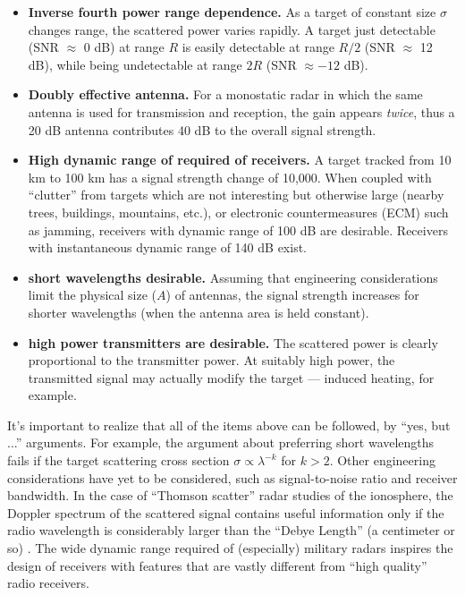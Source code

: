 \begin{itemize}
\item \textbf{Inverse fourth power range dependence.}  As a target of
constant size $\sigma$ changes range, the scattered power varies
rapidly.  A target just detectable (SNR $\approx$ 0 dB) at range $R$ is
easily detectable at range $R/2$ (SNR $\approx$ 12 dB), while being
undetectable at range $2R$ (SNR $\approx -12$ dB).
\item \textbf{Doubly effective antenna.}  For a monostatic radar in
which the same antenna is used for transmission and reception, the
gain appears \textit{twice}, thus a 20 dB antenna contributes 40 dB to
the overall signal strength.
\item \textbf{High dynamic range of required of receivers.}  A target
tracked from 10 km to 100 km has a signal strength change of 10,000.
When coupled with ``clutter'' from targets which are not interesting
but otherwise large (nearby trees, buildings, mountains, etc.), or
electronic countermeasures (ECM) such as jamming, receivers with
dynamic range of 100 dB are desirable.  Receivers with instantaneous
dynamic range of 140 dB exist.
\item \textbf{short wavelengths desirable.}  Assuming that engineering
considerations limit the physical size ($A$) of antennas, the signal
strength increases for shorter wavelengths (when the antenna area is
held constant).
\item \textbf{high power transmitters are desirable.}  The scattered
power is clearly proportional to the transmitter power.  At suitably
high power, the transmitted signal may actually modify the target ---
induced heating, for example.
\end{itemize}

It's important to realize that all of the items above can be followed,
by ``yes, but ...'' arguments.  For example, the argument about
preferring short wavelengths fails if the target scattering cross
section $\sigma \propto \lambda^{-k}$ for $k > 2$.  Other engineering
considerations have yet to be considered, such as signal-to-noise
ratio and receiver bandwidth.  In the case of ``Thomson scatter''
radar studies of the ionosphere, the Doppler spectrum of the scattered
signal contains useful information only if the radio wavelength is
considerably larger than the ``Debye Length'' (a centimeter or so)
\cite{nicholson-1983}.  The wide dynamic range required of
(especially) military radars inspires the design of receivers with
features that are vastly different from ``high quality'' radio
receivers.

